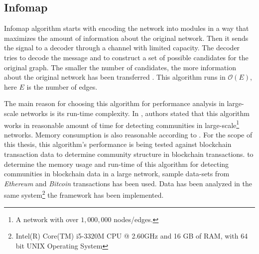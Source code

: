 \subsection{Infomap}
Infomap algorithm starts with encoding the network into modules in a way that maximizes the amount of information about the original network. Then it sends the signal to a decoder through a channel with limited capacity. The decoder tries to decode the message and to construct a set of possible candidates for the original graph. The smaller the number of candidates, the more information about the original network has been transferred \cite{ref-49}. This algorithm runs in $\mathcal{O}(E)$, here $E$ is the number of edges. 

The main reason for choosing this algorithm for performance analysis in large-scale networks is its run-time complexity. In \cite{ref-47}, authors stated that this algorithm works in reasonable amount of time for detecting communities in large-scale\footnote{A network with over $1,000,000$ nodes/edges.}\label{foot:large-scale} networks. Memory consumption is also reasonable according to \cite{ref-47}. For the scope of this thesis, this algorithm's performance is being tested against blockchain transaction data to determine community structure in blockchain transactions. to determine the memory usage and run-time of this algorithm for detecting communities in blockchain data in a large network, sample data-sets from \textit{Ethereum} and \textit{Bitcoin} transactions has been used. Data has been analyzed in the same system\footnote{Intel(R) Core(TM) i5-3320M CPU @ 2.60GHz and 16 GB of RAM, with 64 bit UNIX Operating System} the framework has been implemented. 

